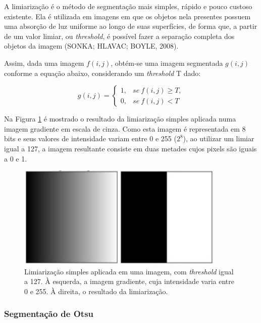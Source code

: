 A limiarização é o método de segmentação mais simples, rápido e pouco custoso existente. Ela é utilizada em imagens em que os objetos nela presentes possuem uma absorção de luz uniforme ao longo de suas superfícies, de forma que, a partir de um valor limiar, ou \textit{threshold}, é possível fazer a separação completa dos objetos da imagem (SONKA; HLAVAC; BOYLE, 2008).

Assim, dada uma imagem $f(i, j)$, obtém-se uma imagem segmentada $g(i, j)$ conforme a equação abaixo, considerando um \textit{threshold} T dado:

\begin{equation} \label{eq:thrd}
	g(i, j) =
		\begin{cases}
			1, & se \ f(i, j) \geq T, \\	
			0, & se \ f(i, j) < T
		\end{cases}
\end{equation}

Na Figura \ref{img:thresholding} é mostrado o resultado da limiarização simples aplicada numa imagem gradiente em escala de cinza. Como esta imagem é representada em 8 bits e seus valores de intensidade  variam entre 0 e 255 ($2^8$), ao utilizar um limiar igual a 127, a imagem resultante consiste em duas metades cujos pixels são iguais a 0 e 1. 

\begin{figure}[H]
\centering
    \caption{\label{img:thresholding} Limiarização simples aplicada em uma imagem, com \textit{threshold} igual a 127. À esquerda, a imagem gradiente, cuja intensidade varia entre 0 e 255. À direita, o resultado da limiarização.}
    \includegraphics[scale=0.5]{img/thresholding.png}
\end{figure}

\subsubsection{Segmentação de Otsu}

